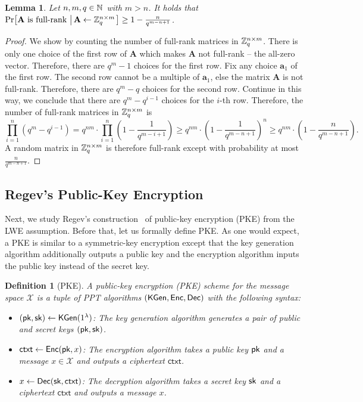 \documentclass[10pt,twoside]{article}
\newtheorem{lemma}[theorem]{Lemma}
\newtheorem{definition}[theorem]{Definition}
\newcommand{\ctxt}{\mathsf{ctxt}}
\newcommand{\cX}{\mathcal{X}}
\renewcommand{\vec}[1]{\mathbf{#1}}
\newcommand{\mat}[1]{\mathbf{#1}}
\begin{document}
\begin{lemma}\label{lem:full-rank}
    Let $n,m,q \in \mathbb{N}$ with $m > n$.
    It holds that
    $\condprob{\mat{A}~\text{is full-rank}}{\mat{A} \gets \ZZ_q^{n \times m}} \geq 1 - \frac{n}{q^{m-n+1}}$.
\end{lemma}

\begin{proof}
    We show by counting the number of full-rank matrices in $\mathbb{Z}_q^{n \times m}$.
    There is only one choice of the first row of $\mat{A}$ which makes $\mat{A}$ not full-rank -- the all-zero vector.
    Therefore, there are $q^m - 1$ choices for the first row.
    Fix any choice $\vec{a}_1$ of the first row.
    The second row cannot be a multiple of $\vec{a}_1$, else the matrix $\mat{A}$ is not full-rank.
    Therefore, there are $q^m - q$ choices for the second row.
    Continue in this way, we conclude that there are $q^m - q^{i-1}$ choices for the $i$-th row.
    Therefore, the number of full-rank matrices in $\mathbb{Z}_q^{n \times m}$ is
    \[\prod_{i=1}^n (q^m - q^{i-1}) = q^{nm} \cdot \prod_{i=1}^n \left( 1 - \frac{1}{q^{m-i+1}} \right) \geq q^{nm} \cdot \left( 1 - \frac{1}{q^{m-n+1}} \right)^n \geq q^{nm} \cdot \left( 1 - \frac{n}{q^{m-n+1}} \right).\]
    A random matrix in $\mathbb{Z}_q^{n \times m}$ is therefore full-rank except with probability at most $\frac{n}{q^{m-n+1}}$.
\end{proof}

\subsection{Regev's Public-Key Encryption}

Next, we study Regev's construction~\cite{STOC:Regev05} of public-key encryption (PKE) from the LWE assumption.
Before that, let us formally define PKE.
As one would expect, a PKE is similar to a symmetric-key encryption except that the key generation algorithm additionally outputs a public key and the encryption algorithm inputs the public key instead of the secret key.

\begin{definition}[PKE]
    A public-key encryption (PKE) scheme for the message space $\cX$ is a tuple of PPT algorithms $(\mathsf{KGen},\mathsf{Enc},\mathsf{Dec})$ with the following syntax:
    \begin{itemize}
        \item $(\pk, \sk) \gets \kgen(\secparam)$: The key generation algorithm generates a pair of public and secret keys $(\pk, \sk)$.
        \item $\ctxt \gets \enc(\pk, x)$: The encryption algorithm takes a public key $\pk$ and a message $x \in \cX$ and outputs a ciphertext $\ctxt$.
        \item $x \gets \dec(\sk, \ctxt)$: The decryption algorithm takes a secret key $\sk$ and a ciphertext $\ctxt$ and outputs a message $x$.
    \end{itemize}
\end{definition}
\end{document}
